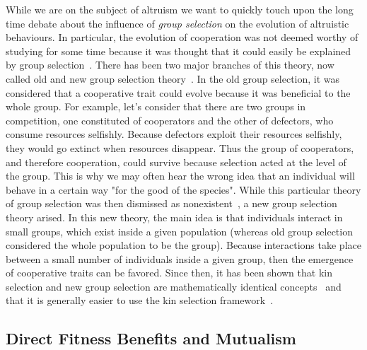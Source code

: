     While we are on the subject of altruism we want to quickly touch upon the long time debate about the influence of \emph{group selection} on the evolution of altruistic behaviours. In particular, the evolution of cooperation was not deemed worthy of studying for some time because it was thought that it could easily be explained by group selection~\parencite{Axelrod1981}. There has been two major branches of this theory, now called old and new group selection theory~\parencite{West2007a}. In the old group selection, it was considered that a cooperative trait could evolve because it was beneficial to the whole group. For example, let's consider that there are two groups in competition, one constituted of cooperators and the other of defectors, who consume resources selfishly. Because defectors exploit their resources selfishly, they would go extinct when resources disappear. Thus the group of cooperators, and therefore cooperation, could survive because selection acted at the level of the group. This is why we may often hear the wrong idea that an individual will behave in a certain way "for the good of the species". While this particular theory of group selection was then dismissed as nonexistent~\parencite{MaynardSmith1976}, a new group selection theory arised. In this new theory, the main idea is that individuals interact in small groups, which exist inside a given population (whereas old group selection considered the whole population to be the group). Because interactions take place between a small number of individuals inside a given group, then the emergence of cooperative traits can be favored. Since then, it has been shown that kin selection and new group selection are mathematically identical concepts~\parencite{Hamilton1975, VanBaalen1998, Gardner2007} and that it is generally easier to use the kin selection framework~\parencite{West2007a}.


  \subsection{Direct Fitness Benefits and Mutualism}

